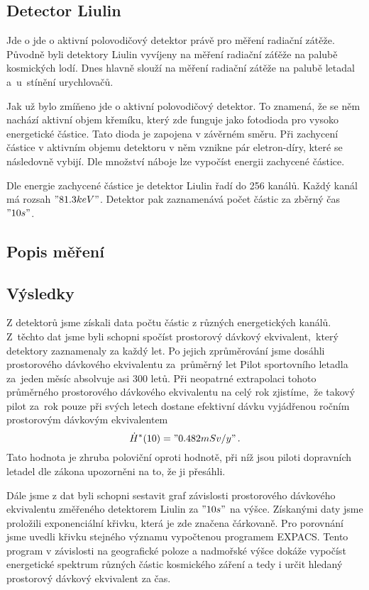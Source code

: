 \documentclass[11pt,a4paper]{article}
\begin{document}
\subsection*{Detector Liulin}
Jde o jde o aktivní polovodičový detektor právě pro měření radiační zátěže.
Původně byli detektory Liulin vyvíjeny na měření radiační záťěže na palubě
kosmických lodí. Dnes hlavně slouží na měření radiační zátěže na palubě letadal
a~u~stínění urychlovačů.\par
Jak už bylo zmíňeno jde o aktivní polovodičový detektor. To znamená, že se
něm nachází aktivní objem křemíku, který zde funguje jako fotodioda pro vysoko
energetické částice. Tato dioda je zapojena v závěrném směru. Při zachycení
částice v aktivním objemu detektoru v něm vznikne pár eletron-díry, které se
následovně vybijí. Dle množství náboje lze vypočíst energii zachycené
částice.\par
Dle energie zachycené částice je detektor Liulin řadí do 256 kanálů. Každý kanál
má rozsah $ "81.3 keV" $. Detektor pak zaznamenává počet částic za zběrný čas
$ "10 s" $.
\subsection*{Popis měření}

\subsection*{Výsledky}
Z detektorů jsme získali data počtu částic z různých energetických kanálů.
Z~těchto dat jsme byli schopni spočíst prostorový dávkový ekvivalent,~který
detektory zaznamenaly za každý let. Po jejich zprůměrování jsme dosáhli
prostorového dávkového ekvivalentu za~průměrný let
Pilot sportovního letadla za~jeden měsíc absolvuje asi 300 letů. Při neopatrné
extrapolaci tohoto průměrného prostorového dávkového ekvivalentu na celý rok
zjistíme,~že takový pilot za~rok pouze při svých letech dostane efektivní dávku
vyjádřenou ročním prostorovým dávkovým ekvivalentem
$$ \dot{H}^\ast(10)="0.482 mSv/y"\,. $$
Tato hodnota je zhruba poloviční oproti hodnotě, při níž jsou piloti dopravních
letadel dle zákona upozorněni na to, že ji přesáhli.\par
Dále jsme z dat byli schopni sestavit graf závislosti prostorového dávkového
ekvivalentu změřeného detektorem Liulin za $"10 s"$ na výšce. Získanými daty
jsme proložili exponenciální křivku, která je zde značena čárkovaně. Pro
porovnání jsme uvedli křivku stejného významu vypočtenou programem EXPACS.
Tento program v závislosti na geografické poloze a nadmořské výšce dokáže
vypočíst energetické spektrum různých částic kosmického záření a tedy i určit
hledaný prostorový dávkový ekvivalent za čas.
\end{document}

